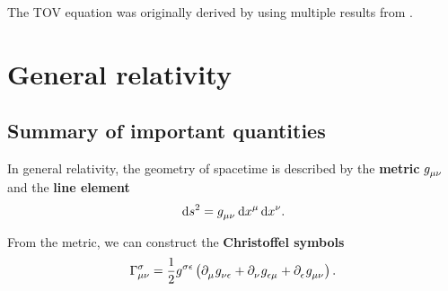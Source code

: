 \documentclass[a4paper,11pt,twoside]{report}
\newcommand\dif{\mathop{}\!\mathrm{d}}
\begin{document}
The TOV equation was originally derived by \cite{ref:tov} using multiple results from \cite{ref:tolman}.

\appendix

\chapter{General relativity}
\section{Summary of important quantities}
\label{chap:gr_summary}

In general relativity, the geometry of spacetime is described by the \textbf{metric} $g\indices{_\mu_\nu}$ and the \textbf{line element}
\begin{equation}
	\dif s^2 = g\indices{_\mu_\nu} \dif x^\mu \dif x^\nu .
	\label{eq:def_line_elem}
\end{equation}

From the metric, we can construct the \textbf{Christoffel symbols}
\begin{equation}
	\Gamma^\sigma_{\mu \nu} = \frac{1}{2} g\indices{^\sigma^\epsilon} \left(
		\partial\indices{_\mu} g\indices{_\nu_\epsilon} +
		\partial\indices{_\nu} g\indices{_\epsilon_\mu} +
		\partial\indices{_\epsilon} g\indices{_\mu_\nu}
	\right) .
	\label{eq:def_christoffel}
\end{equation}
\end{document}
